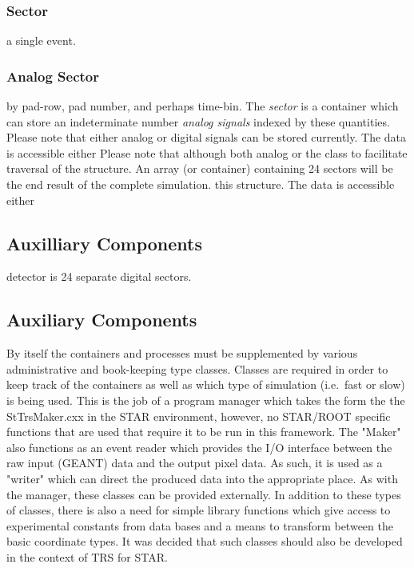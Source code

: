 \documentclass[twoside]{article}
\newcommand{\name}[1]{\textsf{#1}}%
\begin{document}
\subsubsection{Sector}
a single event.  

\subsubsection{Analog Sector}
by pad-row, pad number, and perhaps time-bin.  The {\em sector} is
a container which can store an indeterminate number {\em analog signals}
indexed by these quantities.  Please note that either analog or
digital signals can be stored currently.  The data is accessible either
Please note that although both analog or
the class to facilitate traversal of the structure.  An array (or container)
containing 24 sectors will be the end result of the complete simulation.
this structure.  The data is accessible either

\subsection{Auxilliary Components}
detector is 24 separate digital sectors.

\subsection{Auxiliary Components}

By itself the containers and processes must be supplemented by
various administrative and book-keeping type classes.
Classes are required in order to keep track of the containers 
as well as which type of simulation (i.e.~fast or slow) is being used.  
This is the job of a program manager which takes the form the 
the \name{StTrsMaker.cxx} in the STAR environment, however,
no STAR/ROOT specific functions that are used that require it
to be run in this framework.  The "Maker" also functions as
an event reader which provides the I/O interface between the
raw input (GEANT) data and the output pixel data.  As such, it
is used as a "writer" which can direct the produced data
into the appropriate place.  As with the manager, these classes
can be provided externally.  In addition to these types of classes,
there is also a need for simple library functions which give
access to experimental constants from data bases and a means to
transform between the basic coordinate types.  It was decided that
such classes should also be developed in the context of \name{TRS} for
STAR.
\end{document}
